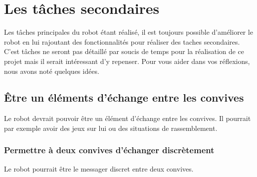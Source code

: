 \section{Les tâches secondaires}

Les tâches principales du robot étant réalisé, il est toujours possible d’améliorer le robot en lui rajoutant des fonctionnalités pour réaliser des taches secondaires. C’est tâches ne seront pas détaillé par soucis de temps pour la réalisation de ce projet mais il serait intéressant d’y repenser. Pour vous aider dans vos réflexions, nous avons noté quelques idées.

\subsection{\^Etre un éléments d'échange entre les convives}

Le robot devrait pouvoir être un élément d’échange entre les convives. Il pourrait par exemple avoir des jeux sur lui ou des situations de rassemblement.

\subsubsection{Permettre à deux convives d'échanger discrètement}

Le robot pourrait être le messager discret entre deux convives.
